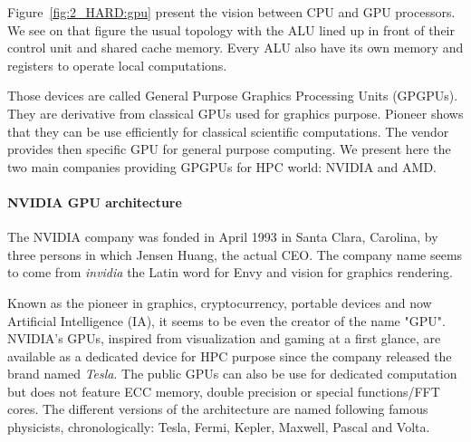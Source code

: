 Figure~\ref{fig:2_HARD:gpu} present the vision between CPU and GPU processors. 
We see on that figure the usual topology with the ALU lined up in front of their control unit and shared cache memory. 
Every ALU also have its own memory and registers to operate local computations. 

Those devices are called General Purpose Graphics Processing Units (GPGPUs). 
They are derivative from classical GPUs used for graphics purpose.
Pioneer shows that they can be use efficiently for classical scientific computations.
The vendor provides then specific GPU for general purpose computing.  
We present here the two main companies providing GPGPUs for HPC world: NVIDIA and AMD.

\paragraph{NVIDIA GPU architecture}
The NVIDIA company was fonded in April 1993 in Santa Clara, Carolina, by three persons in which Jensen Huang, the actual CEO.
The company name seems to come from \textit{invidia} the Latin word for Envy and vision for graphics rendering. 

Known as the pioneer in graphics, cryptocurrency, portable devices and now Artificial Intelligence (IA), it seems to be even the creator of the name "GPU".
NVIDIA's GPUs, inspired from visualization and gaming at a first glance, are available as a dedicated device for HPC purpose since the company released the brand named \textit{Tesla}. 
The public GPUs can also be use for dedicated computation but does not feature ECC memory, double precision or special functions/FFT cores. 
The different versions of the architecture are named following famous physicists, chronologically: Tesla, Fermi, Kepler, Maxwell, Pascal and Volta.

